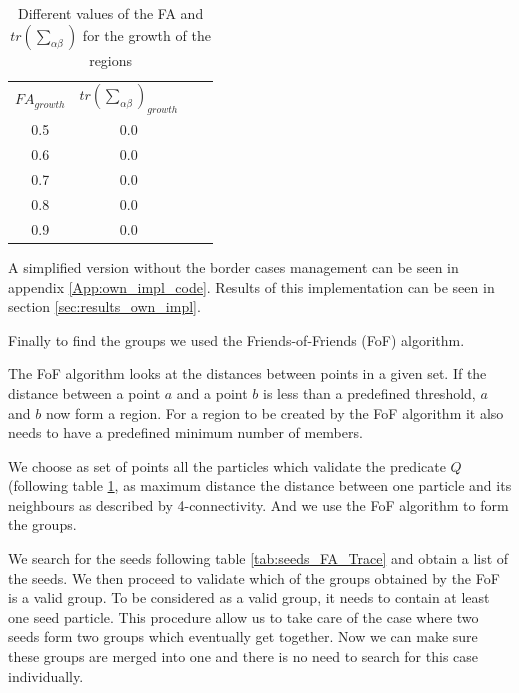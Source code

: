 \documentclass[12pt]{article}
\begin{document}
\begin{itemize}
\begin{table}[ht]
    \centering
    \begin{tabular}{|c|c|c|c|}
        $FA_{growth}$ & $tr\left(\sum_{\alpha \beta}\right)_{growth}$ \\
        0.5 &  0.0 \\
        0.6 &  0.0 \\
        0.7 &  0.0 \\
        0.8 &  0.0 \\
        0.9 &  0.0 \\
    \end{tabular}
    \caption{Different values of the FA and $tr\left(\sum_{\alpha \beta}\right)$ for the growth of the regions}
    \label{tab:search_FA_Trace}
\end{table}
\FloatBarrier

\end{itemize}

\begin{par}
A simplified version without the border cases
 management can be seen in appendix \ref{App:own_impl_code}. Results of this
  implementation can be seen in section
   \ref{sec:results_own_impl}.
\end{par}

\begin{par}
Finally to find the groups we used the Friends-of-Friends (FoF) algorithm.
\end{par}
\begin{par}
The FoF algorithm looks at the distances between points in a given
set. If the distance between a point $a$ and a point $b$ is less
than a predefined threshold, $a$ and $b$ now form a region. For a
region to be created by the FoF algorithm it also needs to have a
predefined minimum number of members. 
\end{par}

\begin{par}
We choose as set of points all the
particles which validate the predicate $Q$ (following table
\ref{tab:search_FA_Trace}, as maximum distance the distance
between one particle and its neighbours as described by
4-connectivity. And we use the FoF algorithm to form the groups. 
\end{par}
\begin{par}
We search for the seeds following table \ref{tab:seeds_FA_Trace}
and obtain a list of the seeds. We then proceed to validate which
of the groups obtained by the FoF is a valid group. To be
considered as a valid group, it needs to contain at least one seed
particle. This procedure allow us to take care of the case where
two seeds form two groups which eventually get together. Now we
can make sure these groups are merged into one and there is no
need to search for this case individually.
\end{par}
\end{document}
